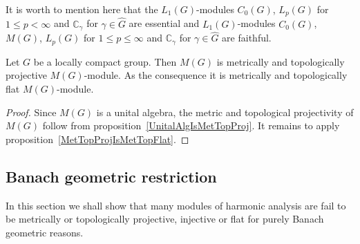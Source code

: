 It is worth to mention here that the $L_1(G)$-modules $C_0(G)$, $L_p(G)$ for
$1\leq p<\infty$ and $\mathbb{C}_\gamma$ for $\gamma\in\widehat{G}$ are
essential and $L_1(G)$-modules $C_0(G)$, $M(G)$, $L_p(G)$ for $1\leq p\leq
\infty$ and $\mathbb{C}_\gamma$ for $\gamma\in\widehat{G}$ are faithful. 

\begin{proposition}\label{MGModMGMetTopProjFlatCharac} Let $G$ be a locally
compact group. Then $M(G)$ is metrically and topologically projective
$M(G)$-module. As the consequence it is metrically and topologically flat
$M(G)$-module.
\end{proposition} 
\begin{proof} Since $M(G)$ is a unital algebra, the metric and topological
projectivity of $M(G)$ follow from proposition~\ref{UnitalAlgIsMetTopProj}. It
remains to apply proposition~\ref{MetTopProjIsMetTopFlat}.
\end{proof}


\subsection{
    Banach geometric restriction
}\label{SubSectionBanachGeometricRestriction}

In this section we shall show that many modules of harmonic analysis are fail to
be metrically or topologically projective, injective or flat for purely Banach
geometric reasons. 

